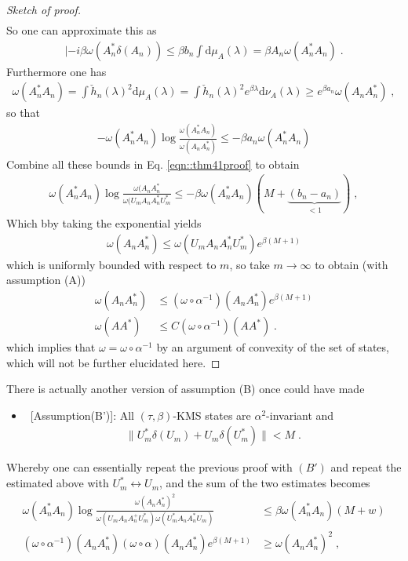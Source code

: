 \documentclass[
a4paper, %
11pt, %
onecolumn, %
openany, %
]{memoir}
\theoremstyle{definition}
\theoremstyle{remark}
\theoremstyle{plain}
\begin{document}
\begin{proof}[Sketch of proof]
\begin{align}
\end{align}
So one can approximate this as \begin{align}
|-i\beta\omega(A_n^*\delta(A_n))\leq \beta b_n\int\mathrm{d}\mu_A(\lambda)=\beta A_n \omega(A_n^*A_n)\;.
\end{align}
Furthermore one has \begin{align}
\omega(A_n^*A_n)=\int \check{h}_n(\lambda)^2\mathrm{d}\mu_A(\lambda)=\int \check{h}_n(\lambda)^2e^{\beta \lambda}\mathrm{d}\nu_A(\lambda)\geq e^{\beta a_n}\omega(A_nA_n^*)\; ,
\end{align}
so that \begin{align}
-\omega(A_n^*A_n)\log \frac{\omega(A_n^*A_n)}{\omega(A_nA_n^*)}\leq -\beta a_n\omega(A_n^*A_n)
\end{align}
Combine all these bounds in Eq. \eqref{eqn::thm41proof} to obtain \begin{align}
\omega(A^*_nA_n)\log \frac{\omega(A_nA_n^*}{\omega(U_mA_nA_n^*U_m^*}\leq -\beta \omega (A_n^*A_n)(M+\underbrace{(b_n-a_n)}_{<1})\; ,
\end{align}
Which bby taking the exponential yields \begin{align}
\omega(A_nA_n^*)\leq \omega(U_mA_nA_n^*U_m^*)e^{\beta(M+1)}
\end{align}
which is uniformly bounded with respect to $m$, so take $m\rightarrow\infty$ to obtain (with assumption (A)) \begin{align}
\omega(A_nA_n^*)&\leq (\omega\circ\alpha^{-1})(A_nA_n^*)e^{\beta(M+1)}\\
\omega(AA^*)&\leq C(\omega\circ\alpha^{-1})(AA^*)\;.
\end{align}
which implies that $\omega=\omega\circ \alpha^{-1}$ by an argument of convexity of the set of states, which will not be further elucidated here.
\end{proof}
There is actually another version of assumption (B) once could have made \begin{itemize}
\item~[Assumption(B')]: All $(\tau,\beta)$-KMS states are $\alpha^2$-invariant and \begin{align}
\|U_m^*\delta(U_m)+U_m\delta(U_m^*)\|< M\;.
\end{align}\end{itemize}
Whereby one can essentially repeat the previous proof with $(B')$ and repeat the estimated above with $U_m^*\leftrightarrow U_m$, and the sum of the two estimates becomes \begin{align}
\omega(A^*_nA_n)\log\frac{\omega(A_nA_n^*)^2}{\omega(U_mA_nA_n^+U_m^*)\omega(U_m^*A_nA_n^*U_m)}&\leq \beta\omega(A_n^*A_n)(M+w)\\
(\omega\circ\alpha^{-1})(A_nA_n^*)(\omega\circ\alpha)(A_nA_n^*)e^{\beta(M+1)}&\geq \omega(A_nA_n^*)^2\; ,
\end{align}
\end{document}

